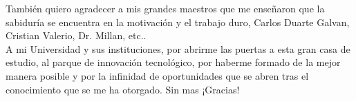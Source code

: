 
\begin{acknowledgements}

También quiero agradecer a mis grandes maestros que me enseñaron que la sabiduría se encuentra en la motivación y el trabajo duro, Carlos Duarte Galvan, Cristian Valerio, Dr. Millan, etc..\\
A mi Universidad y sus instituciones, por abrirme las puertas a esta gran casa de estudio, al parque de innovación tecnológico, por haberme formado de la mejor manera posible y por la infinidad de oportunidades que se abren tras el conocimiento que se me ha otorgado. Sin mas ¡Gracias!
\end{acknowledgements}





